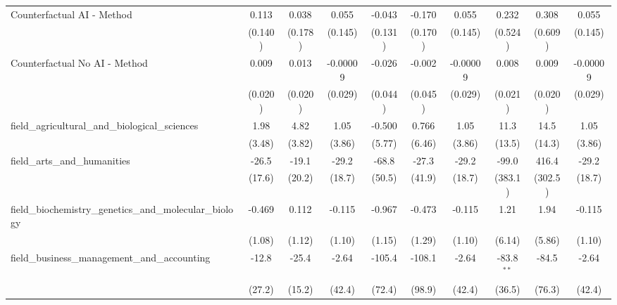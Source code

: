 \begin{tabular}{lccccccccc}
   Counterfactual AI - Method                                  & 0.113         & 0.038         & 0.055         & -0.043       & -0.170       & 0.055         & 0.232        & 0.308   & 0.055\\   
                                                               & (0.140)       & (0.178)       & (0.145)       & (0.131)      & (0.170)      & (0.145)       & (0.524)      & (0.609) & (0.145)\\   
   Counterfactual No AI - Method                               & 0.009         & 0.013         & -0.00009      & -0.026       & -0.002       & -0.00009      & 0.008        & 0.009   & -0.00009\\   
                                                               & (0.020)       & (0.020)       & (0.029)       & (0.044)      & (0.045)      & (0.029)       & (0.021)      & (0.020) & (0.029)\\   
   field\_agricultural\_and\_biological\_sciences              & 1.98          & 4.82          & 1.05          & -0.500       & 0.766        & 1.05          & 11.3         & 14.5    & 1.05\\   
                                                               & (3.48)        & (3.82)        & (3.86)        & (5.77)       & (6.46)       & (3.86)        & (13.5)       & (14.3)  & (3.86)\\   
   field\_arts\_and\_humanities                                & -26.5         & -19.1         & -29.2         & -68.8        & -27.3        & -29.2         & -99.0        & 416.4   & -29.2\\   
                                                               & (17.6)        & (20.2)        & (18.7)        & (50.5)       & (41.9)       & (18.7)        & (383.1)      & (302.5) & (18.7)\\   
   field\_biochemistry\_genetics\_and\_molecular\_biology      & -0.469        & 0.112         & -0.115        & -0.967       & -0.473       & -0.115        & 1.21         & 1.94    & -0.115\\   
                                                               & (1.08)        & (1.12)        & (1.10)        & (1.15)       & (1.29)       & (1.10)        & (6.14)       & (5.86)  & (1.10)\\   
   field\_business\_management\_and\_accounting                & -12.8         & -25.4         & -2.64         & -105.4       & -108.1       & -2.64         & -83.8$^{**}$ & -84.5   & -2.64\\   
                                                               & (27.2)        & (15.2)        & (42.4)        & (72.4)       & (98.9)       & (42.4)        & (36.5)       & (76.3)  & (42.4)\\   

\end{tabular}
